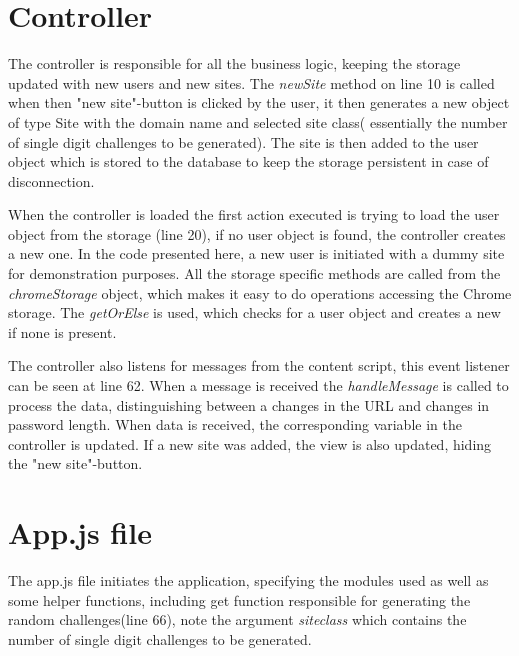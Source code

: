\section{Controller}\label{app:controller}

The controller is responsible for all the business logic, keeping the storage updated with new users and new sites. The \emph{newSite} method on line 10 is called when then "new site"-button is clicked by the user, it then generates a new object of type Site with the domain name and selected site class( essentially the number of single digit challenges to be generated). The site is then added to the user object which is stored to the database to keep the storage persistent in case of disconnection. 
\par When the controller is loaded the first action executed is trying to load the user object from the storage (line 20), if no user object is found, the controller creates a new one. In the code presented here, a new user is initiated with a dummy site for demonstration purposes. All the storage specific methods are called from the \emph{chromeStorage} object, which makes it easy to do operations accessing the Chrome storage. The \emph{getOrElse} is used, which checks for a user object and creates a new if none is present. 
\par The controller also listens for messages from the content script, this event listener can be seen at line 62. When a message is received the \emph{handleMessage} is called to process the data, distinguishing between a changes in the URL and changes in password length. When data is received, the corresponding variable in the controller is updated. If a new site was added, the view is also updated, hiding the "new site"-button.

\section{App.js file}\label{app:app.js}


The app.js file initiates the application, specifying the modules used as well as some helper functions, including get function responsible for generating the random challenges(line 66), note the argument \emph{siteclass} which contains the number of single digit challenges to be generated. 


